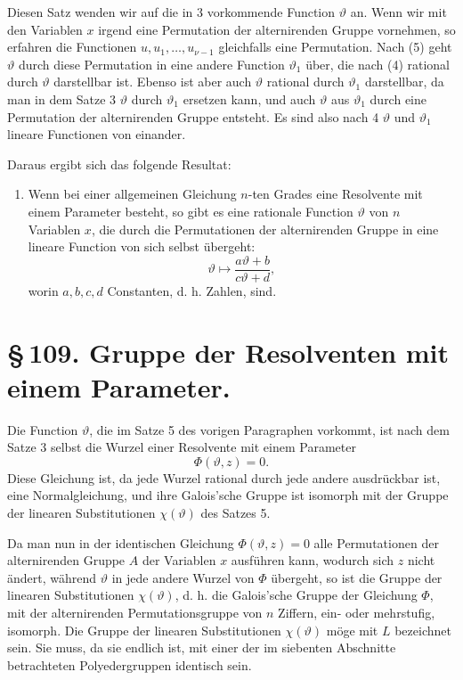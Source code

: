 \documentclass[11pt]{article}
\begin{document}
Diesen Satz wenden wir auf die in 3 vorkommende Function \(\vartheta\) an. Wenn wir mit den Variablen \(x\) irgend eine Permutation der alternirenden Gruppe vornehmen, so erfahren die Functionen \(u,u_1,\ldots,u_{\nu-1}\) gleichfalls eine Permutation. Nach (5) geht \(\vartheta\) durch diese Permutation in eine andere Function \(\vartheta_1\) über, die nach (4) rational durch \(\vartheta\) darstellbar ist. Ebenso ist aber auch \(\vartheta\) rational durch \(\vartheta_1\) darstellbar, da man in dem Satze 3 \(\vartheta\) durch \(\vartheta_1\) ersetzen kann, und auch \(\vartheta\) aus \(\vartheta_1\) durch eine Permutation der alternirenden Gruppe entsteht. Es sind also nach 4 \(\vartheta\) und \(\vartheta_1\) lineare Functionen von einander.

Daraus ergibt sich das folgende Resultat:

\begin{enumerate}[label=\arabic*.,start=5]
\item Wenn bei einer allgemeinen Gleichung \(n\)-ten Grades eine Resolvente mit einem Parameter besteht, so gibt es eine rationale Function \(\vartheta\) von \(n\) Variablen \(x\), die durch die Permutationen der alternirenden Gruppe in eine lineare Function von sich selbst übergeht:
\[
\vartheta\longmapsto\frac{a\vartheta+b}{c\vartheta+d},
\]
worin \(a,b,c,d\) Constanten, d. h. Zahlen, sind.
\end{enumerate}

\section*{\S\,109. Gruppe der Resolventen mit einem Parameter.}

Die Function \(\vartheta\), die im Satze 5 des vorigen Paragraphen vorkommt, ist nach dem Satze 3 selbst die Wurzel einer Resolvente mit einem Parameter
\[
\Phi(\vartheta,z)=0.
\]
Diese Gleichung ist, da jede Wurzel rational durch jede andere ausdrückbar ist, eine Normalgleichung, und ihre Galois'sche Gruppe ist isomorph mit der Gruppe der linearen Substitutionen \(\chi(\vartheta)\) des Satzes 5.

Da man nun in der identischen Gleichung \(\Phi(\vartheta,z)=0\) alle Permutationen der alternirenden Gruppe \(A\) der Variablen \(x\) ausführen kann, wodurch sich \(z\) nicht ändert, während \(\vartheta\) in jede andere Wurzel von \(\Phi\) übergeht, so ist die Gruppe der linearen Substitutionen \(\chi(\vartheta)\), d. h. die Galois'sche Gruppe der Gleichung \(\Phi\), mit der alternirenden Permutationsgruppe von \(n\) Ziffern, ein- oder mehrstufig, isomorph. Die Gruppe der linearen Substitutionen \(\chi(\vartheta)\) möge mit \(L\) bezeichnet sein. Sie muss, da sie endlich ist, mit einer der im siebenten Abschnitte betrachteten Polyedergruppen identisch sein.
\end{document}
